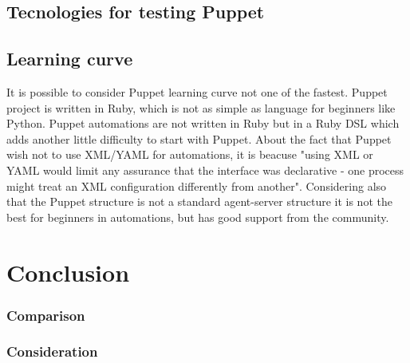 \documentclass[12pt,a4paper,openright,twoside]{book}
\begin{document}
\cite{puppetDocSupportAgents}

\section{Tecnologies for testing Puppet}

\section{Learning curve}
It is possible to consider Puppet learning curve not one of the fastest.
Puppet project is written in Ruby, which is not as simple as language for beginners like Python.
Puppet automations are not written in Ruby but in a Ruby DSL which adds another little difficulty to start with Puppet.
About the fact that Puppet wish not to use XML/YAML for automations, it is beacuse "using XML or YAML would limit any assurance that the interface was declarative - one process might treat an XML configuration differently from another"\cite{puppetDocOldFAQ}.
Considering also that the Puppet structure is not a standard agent-server structure it is not the best for beginners in automations, but has good support from the community.

\chapter{Conclusion}

\subsection{Comparison}

\subsection{Consideration}



\backmatter

\nocite{*} %



\end{document}
